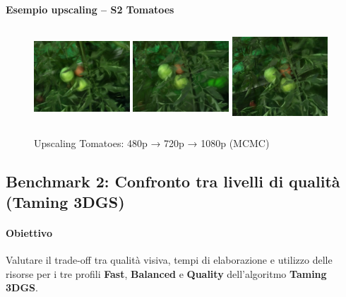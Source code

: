 \paragraph{Esempio upscaling -- S2 Tomatoes}
\begin{figure}[H]
	\centering
	\includegraphics[width=0.32\textwidth,height=3.5cm,trim={80 40 80 40},clip]{images/benchmarks/tomatoes_480_mcmc.jpg}
	\includegraphics[width=0.32\textwidth,height=3.5cm,trim={80 40 80 40},clip]{images/benchmarks/tomatoes_720_mcmc.jpg}
	\includegraphics[width=0.32\textwidth,height=3.5cm,trim={80 40 80 40},clip]{images/benchmarks/tomatoes_1080_mcmc.jpg}
	\caption{Upscaling Tomatoes: 480p → 720p → 1080p (MCMC)}
	\label{fig:tomatoes_resolution_comparison}
\end{figure}



\subsection{Benchmark 2: Confronto tra livelli di qualit\`a (Taming 3DGS)}
\label{subsec:benchmark2_quality_levels}

\paragraph{Obiettivo}
Valutare il trade-off tra qualit\`a visiva, tempi di elaborazione e utilizzo delle risorse
per i tre profili \textbf{Fast}, \textbf{Balanced} e \textbf{Quality} dell'algoritmo \textbf{Taming 3DGS}.


